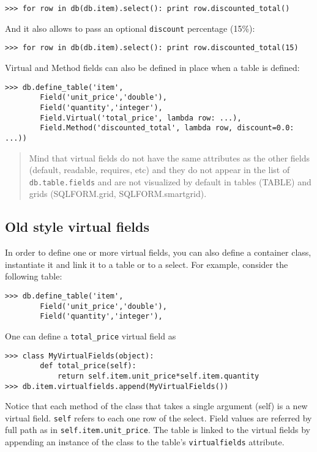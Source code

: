\documentclass[justified,sixbynine,notoc]{tufte-book}
\def\ft{\small\tt}
\begin{document}
\begin{fullwidth}
\begin{lstlisting}
>>> for row in db(db.item).select(): print row.discounted_total()
\end{lstlisting}

And it also allows to pass an optional {\ft discount} percentage (15\%):

\begin{lstlisting}
>>> for row in db(db.item).select(): print row.discounted_total(15)
\end{lstlisting}

Virtual and Method fields can also be defined in place when a table is defined:

\begin{lstlisting}
>>> db.define_table('item',
        Field('unit_price','double'),
        Field('quantity','integer'),
        Field.Virtual('total_price', lambda row: ...),
        Field.Method('discounted_total', lambda row, discount=0.0: ...))
\end{lstlisting}

\begin{quote}Mind that virtual fields do not have the same attributes as the other fields (default, readable, requires, etc) and they do not appear in the list of {\ft db.table.fields} and are not visualized by default in tables (TABLE) and grids (SQLFORM.grid, SQLFORM.smartgrid).\end{quote}
\goodbreak\subsection{Old style virtual fields}

In order to define one or more virtual fields, you can also define a container class, instantiate it and link it to a table or to a select. For example, consider the following table:

\begin{lstlisting}
>>> db.define_table('item',
        Field('unit_price','double'),
        Field('quantity','integer'),
\end{lstlisting}

One can define a {\ft total\_price} virtual field as
\begin{lstlisting}
>>> class MyVirtualFields(object):
        def total_price(self):
            return self.item.unit_price*self.item.quantity
>>> db.item.virtualfields.append(MyVirtualFields())
\end{lstlisting}

Notice that each method of the class that takes a single argument (self) is a new virtual field. {\ft self} refers to each one row of the select. Field values are referred by full path as in {\ft self.item.unit\_price}. The table is linked to the virtual fields by appending an instance of the class to the table's {\ft virtualfields} attribute.


\end{fullwidth}
\end{document}
